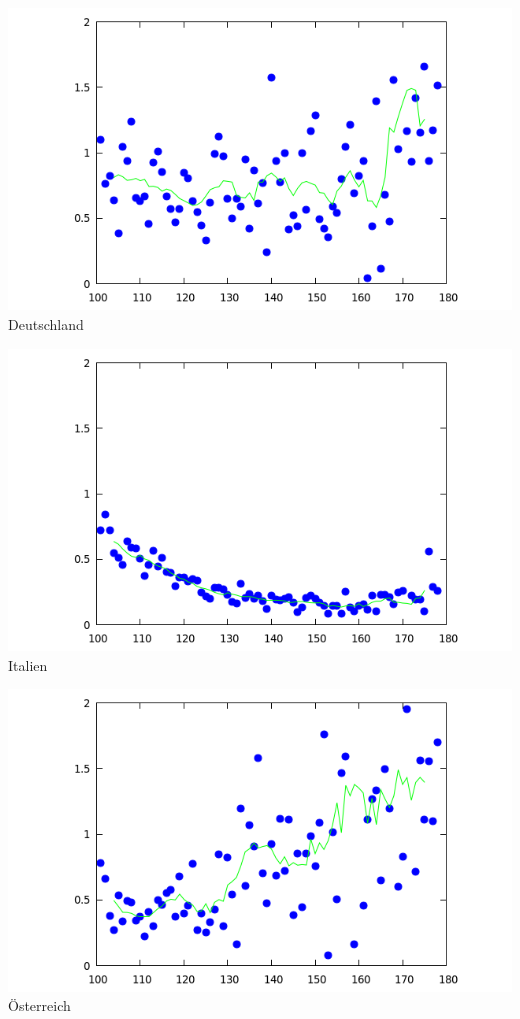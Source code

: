 \documentclass[a4paper,11pt]{article}
\begin{document}
\begin{center}
  \begin{minipage}{.3\textwidth}\centering
    \includegraphics[width=\textwidth]{Germany-R.png}\\[1em] {Deutschland}
  \end{minipage}\hfill
  \begin{minipage}{.3\textwidth}\centering
    \includegraphics[width=\textwidth]{Italy-R.png}\\[1em] {Italien}
  \end{minipage}\hfill
  \begin{minipage}{.3\textwidth}\centering
    \includegraphics[width=\textwidth]{Austria-R.png}\\[1em] {Österreich}
  \end{minipage}


\end{center}
\end{document}
